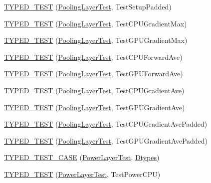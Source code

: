 \begin{DoxyCompactItemize}
\item 
\hyperlink{namespacecaffe_a7bac4b966ab06a44d2f100fc0d7fd15e}{T\+Y\+P\+E\+D\+\_\+\+T\+E\+S\+T} (\hyperlink{classcaffe_1_1_pooling_layer_test}{Pooling\+Layer\+Test}, Test\+Setup\+Padded)
\item 
\hyperlink{namespacecaffe_acbde3aface156425d10cb14324ef2248}{T\+Y\+P\+E\+D\+\_\+\+T\+E\+S\+T} (\hyperlink{classcaffe_1_1_pooling_layer_test}{Pooling\+Layer\+Test}, Test\+C\+P\+U\+Gradient\+Max)
\item 
\hyperlink{namespacecaffe_ad0f9f5a32bcfdf97b8a419b8cc7937ba}{T\+Y\+P\+E\+D\+\_\+\+T\+E\+S\+T} (\hyperlink{classcaffe_1_1_pooling_layer_test}{Pooling\+Layer\+Test}, Test\+G\+P\+U\+Gradient\+Max)
\item 
\hyperlink{namespacecaffe_a9735031d8b7b27becc99e2de5d6d3220}{T\+Y\+P\+E\+D\+\_\+\+T\+E\+S\+T} (\hyperlink{classcaffe_1_1_pooling_layer_test}{Pooling\+Layer\+Test}, Test\+C\+P\+U\+Forward\+Ave)
\item 
\hyperlink{namespacecaffe_af000d256ed30f0d1b1780326c5b4d3a1}{T\+Y\+P\+E\+D\+\_\+\+T\+E\+S\+T} (\hyperlink{classcaffe_1_1_pooling_layer_test}{Pooling\+Layer\+Test}, Test\+G\+P\+U\+Forward\+Ave)
\item 
\hyperlink{namespacecaffe_a7402d0881eb0ecf97d7c55344a65f357}{T\+Y\+P\+E\+D\+\_\+\+T\+E\+S\+T} (\hyperlink{classcaffe_1_1_pooling_layer_test}{Pooling\+Layer\+Test}, Test\+C\+P\+U\+Gradient\+Ave)
\item 
\hyperlink{namespacecaffe_a93fc346dcb8890ec3c6d3354fb346803}{T\+Y\+P\+E\+D\+\_\+\+T\+E\+S\+T} (\hyperlink{classcaffe_1_1_pooling_layer_test}{Pooling\+Layer\+Test}, Test\+G\+P\+U\+Gradient\+Ave)
\item 
\hyperlink{namespacecaffe_aa7a164db61a5ef9b2878a3035f20ee3b}{T\+Y\+P\+E\+D\+\_\+\+T\+E\+S\+T} (\hyperlink{classcaffe_1_1_pooling_layer_test}{Pooling\+Layer\+Test}, Test\+C\+P\+U\+Gradient\+Ave\+Padded)
\item 
\hyperlink{namespacecaffe_aadce395fe6f2e066c3e55f42b1a98170}{T\+Y\+P\+E\+D\+\_\+\+T\+E\+S\+T} (\hyperlink{classcaffe_1_1_pooling_layer_test}{Pooling\+Layer\+Test}, Test\+G\+P\+U\+Gradient\+Ave\+Padded)
\item 
\hyperlink{namespacecaffe_a4e5ccd73b60cec3460e2af8cf5a1b1a3}{T\+Y\+P\+E\+D\+\_\+\+T\+E\+S\+T\+\_\+\+C\+A\+S\+E} (\hyperlink{classcaffe_1_1_power_layer_test}{Power\+Layer\+Test}, \hyperlink{namespacecaffe_a131dc2be50f2f10e18450da61cde6b57}{Dtypes})
\item 
\hyperlink{namespacecaffe_adb455cd2518bbfae538e41b9b0349170}{T\+Y\+P\+E\+D\+\_\+\+T\+E\+S\+T} (\hyperlink{classcaffe_1_1_power_layer_test}{Power\+Layer\+Test}, Test\+Power\+C\+P\+U)

\end{DoxyCompactItemize}
